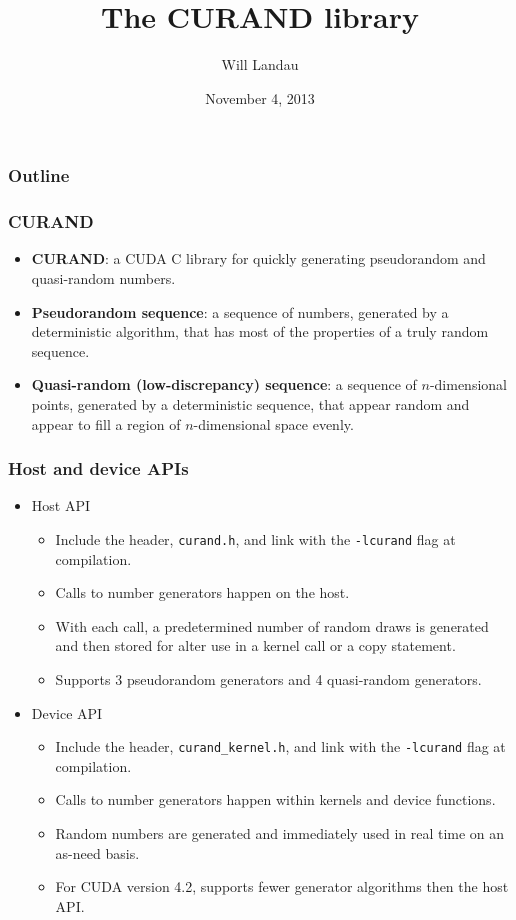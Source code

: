 \documentclass[handout]{beamer}
\title{The CURAND library}
\author{Will Landau}
\date{November 4, 2013}
\institute{Iowa State University}
\numberwithin{equation}{section}
\begin{document}
\begin{frame}
\titlepage
 \end{frame}
 
 \begin{frame}
\frametitle{Outline}
\tableofcontents
\end{frame}
 


\begin{frame}
\frametitle{CURAND}
\begin{itemize}
\item {\bf CURAND}: a CUDA C library for quickly generating pseudorandom and quasi-random numbers.
\pause \item {\bf Pseudorandom sequence}: a sequence of numbers, generated by a deterministic algorithm, that has most of the properties of a truly random sequence.
\pause \item {\bf Quasi-random (low-discrepancy) sequence}: a sequence of $n$-dimensional points, generated by a deterministic sequence, that appear random and appear to fill a region of $n$-dimensional space evenly.
\end{itemize}
\end{frame}


\begin{frame}
\frametitle{Host and device APIs}
\begin{itemize}
\item Host API
\begin{itemize}
\pause \item Include the header, {\tt curand.h}, and link with the {\tt -lcurand} flag at compilation. 
\pause \item Calls to number generators happen on the host.
\pause \item With each call, a predetermined number of random draws is generated and then stored for alter use in a kernel call or a copy statement.
\pause \item Supports 3 pseudorandom generators and 4 quasi-random generators.
\end{itemize}
\pause \item Device API
\begin{itemize}
\pause \item Include the header, {\tt curand\_kernel.h}, and link with the {\tt -lcurand} flag at compilation.
\pause \item Calls to number generators happen within kernels and device functions.
\pause \item Random numbers are generated and immediately used in real time on an as-need basis.
\pause \item For CUDA version 4.2, supports fewer generator algorithms then the host API.
\end{itemize}
\end{itemize}
\end{frame}
\end{document}
